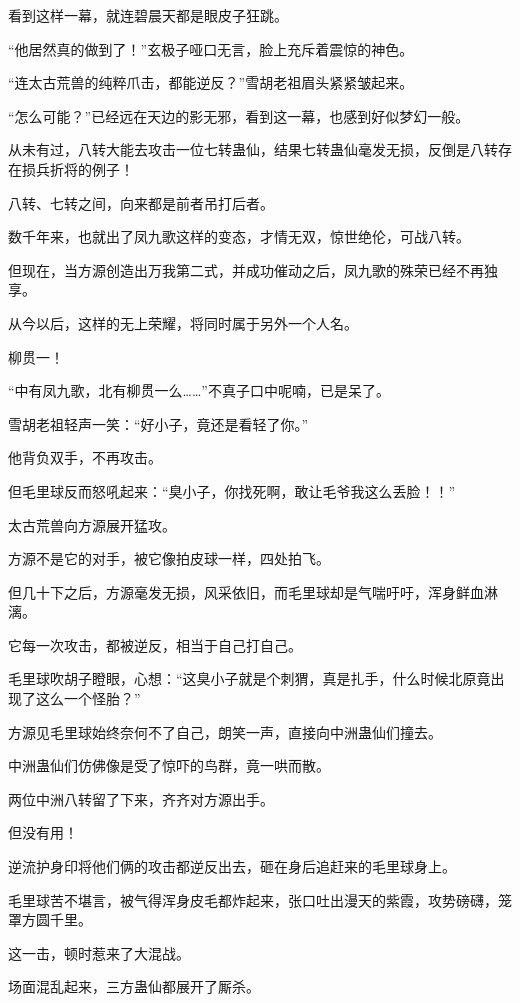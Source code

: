 \begin{this_body}
看到这样一幕，就连碧晨天都是眼皮子狂跳。

“他居然真的做到了！”玄极子哑口无言，脸上充斥着震惊的神色。

“连太古荒兽的纯粹爪击，都能逆反？”雪胡老祖眉头紧紧皱起来。

“怎么可能？”已经远在天边的影无邪，看到这一幕，也感到好似梦幻一般。

从未有过，八转大能去攻击一位七转蛊仙，结果七转蛊仙毫发无损，反倒是八转存在损兵折将的例子！

八转、七转之间，向来都是前者吊打后者。

数千年来，也就出了凤九歌这样的变态，才情无双，惊世绝伦，可战八转。

但现在，当方源创造出万我第二式，并成功催动之后，凤九歌的殊荣已经不再独享。

从今以后，这样的无上荣耀，将同时属于另外一个人名。

柳贯一！

“中有凤九歌，北有柳贯一么……”不真子口中呢喃，已是呆了。

雪胡老祖轻声一笑：“好小子，竟还是看轻了你。”

他背负双手，不再攻击。

但毛里球反而怒吼起来：“臭小子，你找死啊，敢让毛爷我这么丢脸！！”

太古荒兽向方源展开猛攻。

方源不是它的对手，被它像拍皮球一样，四处拍飞。

但几十下之后，方源毫发无损，风采依旧，而毛里球却是气喘吁吁，浑身鲜血淋漓。

它每一次攻击，都被逆反，相当于自己打自己。

毛里球吹胡子瞪眼，心想：“这臭小子就是个刺猬，真是扎手，什么时候北原竟出现了这么一个怪胎？”

方源见毛里球始终奈何不了自己，朗笑一声，直接向中洲蛊仙们撞去。

中洲蛊仙们仿佛像是受了惊吓的鸟群，竟一哄而散。

两位中洲八转留了下来，齐齐对方源出手。

但没有用！

逆流护身印将他们俩的攻击都逆反出去，砸在身后追赶来的毛里球身上。

毛里球苦不堪言，被气得浑身皮毛都炸起来，张口吐出漫天的紫霞，攻势磅礴，笼罩方圆千里。

这一击，顿时惹来了大混战。

场面混乱起来，三方蛊仙都展开了厮杀。


\end{this_body}
